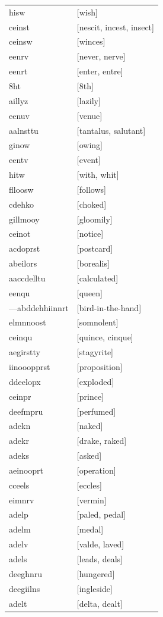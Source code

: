 \documentclass{article}
\begin{document}
\begin{tabular}{ll}
hisw & [wish] \\
ceinst & [nescit, incest, insect] \\
ceinsw & [winces] \\
eenrv & [never, nerve] \\
eenrt & [enter, entre] \\
8ht & [8th] \\
aillyz & [lazily] \\
eenuv & [venue] \\
aalnsttu & [tantalus, salutant] \\
ginow & [owing] \\
eentv & [event] \\
hitw & [with, whit] \\
flloosw & [follows] \\
cdehko & [choked] \\
gillmooy & [gloomily] \\
ceinot & [notice] \\
acdoprst & [postcard] \\
abeilors & [borealis] \\
aaccdelltu & [calculated] \\
eenqu & [queen] \\
---abddehhiinnrt & [bird-in-the-hand] \\
elmnnoost & [somnolent] \\
ceinqu & [quince, cinque] \\
aegirstty & [stagyrite] \\
iinooopprst & [proposition] \\
ddeelopx & [exploded] \\
ceinpr & [prince] \\
deefmpru & [perfumed] \\
adekn & [naked] \\
adekr & [drake, raked] \\
adeks & [asked] \\
aeinooprt & [operation] \\
cceels & [eccles] \\
eimnrv & [vermin] \\
adelp & [paled, pedal] \\
adelm & [medal] \\
adelv & [valde, laved] \\
adels & [leads, deals] \\
deeghnru & [hungered] \\
deegiilns & [ingleside] \\
adelt & [delta, dealt] \\

\end{tabular}
\end{document}
